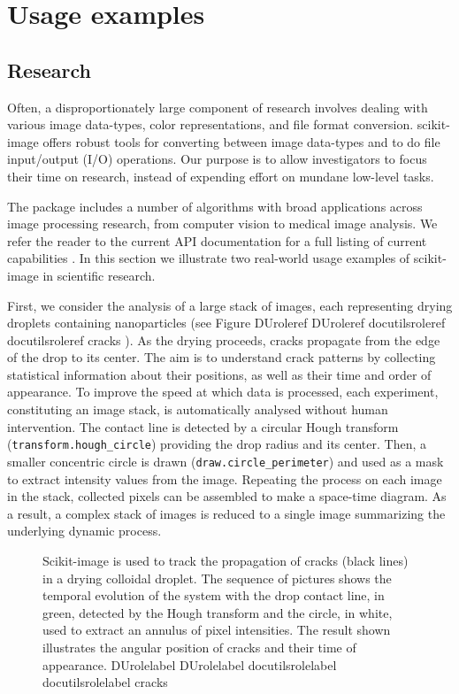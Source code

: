 \documentclass[fleqn,12pt]{wlpeerj}
\providecommand*{\DUrole}[2]{%
  \ifcsname DUrole#1\endcsname%
    \csname DUrole#1\endcsname{#2}%
  \else%
    \ifcsname docutilsrole#1\endcsname%
      \csname docutilsrole#1\endcsname{#2}%
    \else%
      #2%
    \fi%
  \fi%
}
\begin{document}
\section*{Usage examples}
  \label{usage-examples}

\subsection*{Research}
  \label{research}

Often, a disproportionately large component of research involves dealing with
various image data-types, color representations, and file format
conversion. scikit-image offers robust tools for converting between image
data-types \citep{DirectX,OpenGL,GraphicsGemsI} and to do file input/output
(I/O) operations.  Our purpose is to allow investigators to focus their time on
research, instead of expending effort on mundane low-level tasks.

The package includes a number of algorithms with broad applications across
image processing research, from computer vision to medical image analysis. We
refer the reader to the current API documentation for a full listing of current
capabilities \citep{APIdocs}. In this section we illustrate two real-world usage
examples of scikit-image in scientific research.

First, we consider the analysis of a large stack of images, each representing
drying droplets containing nanoparticles (see Figure \DUrole{ref}{cracks}). As the drying proceeds,
cracks propagate from the edge of the drop to its center. The aim is to understand
crack patterns by collecting statistical information about their positions,
as well as their time and order of appearance. To improve the speed at which
data is processed,
each experiment, constituting an image stack, is automatically analysed without
human intervention. The contact line is detected by a circular Hough transform
(\texttt{transform.hough\_circle}) providing the drop radius and its center. Then, a
smaller concentric circle is drawn (\texttt{draw.circle\_perimeter}) and used as
a mask to extract intensity values from the image.
Repeating the process on each image in the stack, collected
pixels can be assembled to make a space-time diagram. As a result, a complex
stack of images is reduced to a single image summarizing the underlying dynamic
process.\begin{figure}[bht]\noindent{}
\caption{Scikit-image is used to track the propagation of cracks (black lines)
in a drying colloidal droplet. The sequence of pictures shows the temporal
evolution of the system with the drop contact line, in green, detected by the
Hough transform and the circle, in white, used to extract an annulus of
pixel intensities.  The result shown illustrates the angular position of
cracks and their time of appearance. \DUrole{label}{cracks}}
\end{figure}
\end{document}
